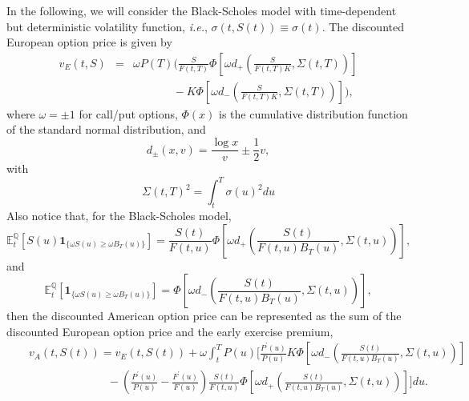 \documentclass[12pt]{article}
\begin{document}
    In the following, we will consider the Black-Scholes model with time-dependent but deterministic volatility
    function, {\it i.e.}, $\sigma(t,S(t))\equiv \sigma(t)$. The discounted European option price is given by
    \begin{eqnarray}
      \label{Euro1}
      v_E(t,S)&=&\omega P(T)\bigg(\frac{S}{F(t,T)}\Phi\left[\omega d_+\left(\frac{S}{F(t,T)K},\Sigma(t,T)\right)\right]\nonumber\\
                         &&\ \ \ \ \ \ \ \ \ \ \ \ \ \ \ \ -K\Phi\left[\omega d_-\left(\frac{S}{F(t,T)K},\Sigma(t,T)\right)\right]\bigg),
    \end{eqnarray}
    where $\omega=\pm 1$ for call/put options, $\Phi(x)$ is the cumulative distribution function of the standard
    normal distribution, and
    \begin{equation}
      d_{\pm}(x, v)=\frac{\log x}{v}\pm\frac{1}{2}v,
    \end{equation}
    with
    \begin{equation}
      \Sigma(t,T)^2=\int_t^T\sigma(u)^2du
    \end{equation}
    Also notice that, for the Black-Scholes model,
    \begin{equation}
      {\mathbb E}_t^{\mathbb Q}\left[S(u)\mathbf{1}_{\{\omega S(u)\geq\omega B_T(u)\}}\right]
       = \frac{S(t)}{F(t,u)}\Phi\left[\omega d_+\left(\frac{S(t)}{F(t,u)B_T(u)}, \Sigma(t,u)\right)\right],
    \end{equation}
    and
    \begin{equation}
      {\mathbb E}_t^{\mathbb Q}\left[\mathbf{1}_{\{\omega S(u)\geq\omega B_T(u)\}}\right]
       = \Phi\left[\omega d_-\left(\frac{S(t)}{F(t,u)B_T(u)}, \Sigma(t,u)\right)\right],
    \end{equation}
    then the discounted American option price can be represented as the sum of the discounted European
    option price and the early exercise premium,
    \begin{eqnarray}
      \label{EEP}
      &&v_A(t,S(t))=v_E(t,S(t))+\omega\int_t^TP(u)\Bigg[\frac{P^{\prime}(u)}{P(u)} K
      \Phi\left[\omega d_-\left(\frac{S(t)}{F(t,u)B_T(u)}, \Sigma(t,u)\right)\right]\nonumber\\
      &&\quad\quad\quad\quad\quad\quad\quad -\left(\frac{P^{\prime}(u)}{P(u)}-\frac{F^{\prime}(u)}{F(u)}\right)
      \frac{S(t)}{F(t,u)}\Phi\left[\omega d_+\left(\frac{S(t)}{F(t,u)B_T(u)}, \Sigma(t,u)\right)\right]\Bigg]du.
    \end{eqnarray}
\end{document}
